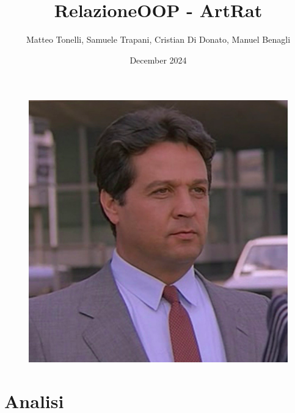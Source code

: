 \documentclass[a4paper,12pt]{report}
\begin{document}
\title{RelazioneOOP - ArtRat}

\begin{figure}
    \centering
    \includegraphics[width=0.5\linewidth]{logo.png}
    \label{fig:enter-label}
\end{figure}

\author{Matteo Tonelli, Samuele Trapani, Cristian Di Donato, Manuel Benagli}
\date{December 2024}

\maketitle

\newpage

\newpage
\tableofcontents
\clearpage

\chapter{Analisi}
\end{document}
